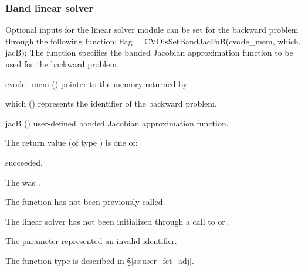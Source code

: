 \subsubsection{Band linear solver}
Optional inputs for the {\cvband} linear solver module can be set for the backward
problem through the following function:
{
  flag = CVDlsSetBandJacFnB(cvode\_mem, which, jacB);
}
{
  The function  specifies the banded Jacobian
  approximation function to be used for the backward problem.
}
{
  \begin{args}
  \item[cvode\_mem] ()
    pointer to the {\cvodes} memory returned by .
  \item[which] ()
    represents the identifier of the backward problem.
  \item[jacB] ()
    user-defined banded Jacobian approximation function.
  \end{args}
}
{
  The return value  (of type ) is one of:
  \begin{args}
  \item[\Id{CVDIRECT\_SUCCESS}] 
     succeeded.
  \item[\Id{CVDIRECT\_MEM\_NULL}]
    The  was .
  \item[\Id{CVDIRECT\_NO\_ADJ}]
    The function  has not been previously called.
  \item[\Id{CVDIRECT\_LMEM\_NULL}]
    The linear solver has not been initialized through a call to 
    or .
  \item[\Id{CVDIRECT\_ILL\_INPUT}]
    The parameter  represented an invalid identifier.
  \end{args}
}
{
  The function type  is described in \S\ref{ss:user_fct_adj}.
}


